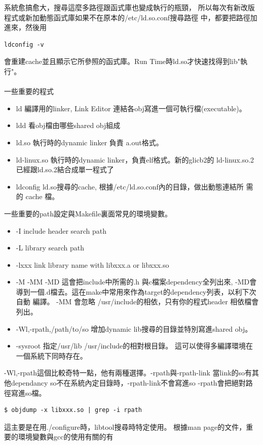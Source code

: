     系統愈搞愈大，搜尋這麼多路徑跟函式庫也變成執行的瓶頸，
    所以每次有新改版程式或新加動態函式庫如果不在原本的/etc/ld.so.conf搜尋路徑
    中，都要把路徑加進來，然後用
        \begin{verbatim}
ldconfig -v 
        \end{verbatim}
    會重建cache並且顯示它所參照的函式庫。Run Time時ld.so才快速找得到lib"執行"。
    \\\\
    一些重要的程式
  \begin{itemize}
    \item ld 編譯用的linker, Link Editor 連結各obj寫進一個可執行檔(executable)。
    \item ldd 看obj檔由哪些shared obj組成
    \item ld.so 執行時的dynamic linker 負責 a.out格式。
    \item ld-linux.so 執行時的dynamic linker，負責elf格式。新的glicb2的
      ld-linux.so.2 已經跟ld.so.2結合成單一程式了
    \item ldconfig ld.so搜尋的cache, 根據/etc/ld.so.conf內的目錄，做出動態連結所
      需的 cache 檔。
  \end{itemize}
  一些重要的path設定與Makefile裏面常見的環境變數。
  \begin{itemize}
    \item -I include header search path
    \item -L library search path
    \item -lxxx link library name with libxxx.a or libxxx.so
    \item -M -MM -MD 這會把include中所需的.h 與c檔案dependency全列出來, -MD會
      導到一個.d檔去。這在make中常用來作為target的dependency列表，以利下次自動
      編譯。 -MM 會忽略 /usr/include的相依，只有你的程式header 相依檔會列出。
    \item -Wl,-rpath,/path/to/so 增加dynamic lib搜尋的目錄並特別寫進shared obj。
    \item -sysroot 指定/usr/lib /usr/include的相對根目錄。
          這可以使得多編譯環境在一個系統下同時存在。
  \end{itemize}
  -Wl,-rpath這個比較奇特一點，他有兩種選擇。-rpath與-rpath-link
  當link的so有其他dependancy so不在系統內定目錄時，-rpath-link不會寫進so
  -rpath會把絕對路徑寫進so檔。
  \begin{verbatim}
$ objdump -x libxxx.so | grep -i rpath
  \end{verbatim}
  這主要是在用./configure時，libtool搜尋時特定使用。
  根據man page的文件，重要的環境變數與gcc的使用有關的有
